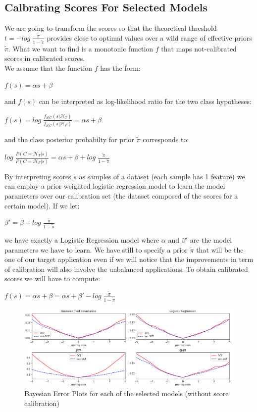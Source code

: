 \documentclass[10pt, a4paper, twocolumn]{article} %
\begin{document}
\subsection{Calbrating Scores For Selected Models}
We are going to transform the scores so that the theoretical threshold $t = -log\;\frac{\tilde{\pi}}{1-\tilde{\pi}}$
provides close to optimal values over a wild range of effective priors $\tilde{\pi}$. What we want to find is a 
monotonic function $f$ that maps not-calibrated scores in calibrated scores.\\
We assume that the function $f$ has the form:
\begin{center}
	$f(s) = \alpha s + \beta$
\end{center}
and $f(s)$ can be interpreted as log-likelihood ratio for the two class hypotheses:
\begin{center}
	$f(s) = log\;\frac{f_{S|C}(s|\mathcal{H}_T)}{f_{S|C}(s|\mathcal{H}_F)} = \alpha s + \beta$
\end{center}
and the class posterior probabilty for prior $\tilde{\pi}$ corresponds to:
\begin{center}
	$log\;\frac{P(C=\mathcal{H}_T|s)}{P(C=\mathcal{H}_F|s)} = \alpha s + \beta + log\;\frac{\tilde{\pi}}{1-\tilde{\pi}}$
\end{center}
By interpreting scores $s$ as samples of a dataset (each sample has 1 feature) we can employ a prior weighted
logistic regression model to learn the model parameters over our calibration set (the dataset composed of the
scores for a certain model). If we let:
\begin{center}
	$\beta' = \beta + log\;\frac{\tilde{\pi}}{1-\tilde{\pi}}$
\end{center}
we have exactly a Logistic Regression model where $\alpha$ and $\beta'$ are the model parameters we have to learn.
We have still to specify a prior $\tilde{\pi}$ that will be the one of our target application even if we will notice
that the improvements in term of calibration will also involve the unbalanced applications. To obtain calibrated
scores we will have to compute:
\begin{center}
	$f(s) = \alpha s + \beta = \alpha s + \beta' - log\;\frac{\tilde{\pi}}{1-\tilde{\pi}}$
\end{center}
\begin{figure}[ht!]
	\includegraphics[width=\linewidth]{./Pictures/FeaturesAnalysis/bestmodels_nc.png}
	\caption{Bayesian Error Plots for each of the selected models (without score calibration)}
	\label{bayesianerrornotcalibrated} 
\end{figure}
\end{document}

